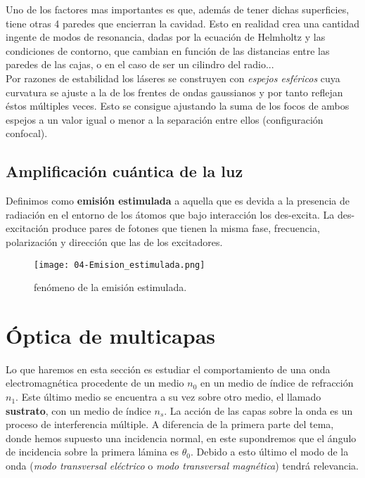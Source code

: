 \documentclass[12pt,a4paper]{book}
\numberwithin{equation}{section}
\numberwithin{figure}{section}
\newcommand{\1}{_{(1)}}
\newcommand{\2}{_{(2)}}
\theoremstyle{definition}
\begin{document}
Uno de los factores mas importantes es que, además de tener dichas superficies, tiene otras 4 paredes que encierran la cavidad. Esto en realidad crea una cantidad ingente de modos de resonancia, dadas por la ecuación de Helmholtz y las condiciones de contorno, que cambian en función de las distancias entre las paredes de las cajas, o en el caso de ser un cilindro del radio... \\

Por razones de estabilidad los láseres se construyen con \textit{espejos esféricos} cuya curvatura se ajuste a la de los frentes de ondas gaussianos y por tanto reflejan éstos múltiples veces. Esto se consigue ajustando la suma de los focos de ambos espejos a un valor igual o menor a la separación entre ellos (configuración confocal). 

\subsection{Amplificación cuántica de la luz}

Definimos como \textbf{emisión estimulada} a aquella que es devida a la presencia de radiación en el entorno de los átomos que bajo interacción los des-excita. La des-excitación produce pares de fotones que tienen la misma fase, frecuencia, polarización y dirección que las de los excitadores. \\

\begin{figure}[h!] \centering
\texttt{[image: 04-Emision\_estimulada.png]}
\caption{fenómeno de la emisión estimulada.}
\label{Fig:04.5-05}
\end{figure}

\section{Óptica de multicapas}

Lo que haremos en esta sección es estudiar el comportamiento de una onda electromagnética procedente de un medio $n_0$ en un medio de índice de refracción $n_1$. Este último medio se encuentra a su vez sobre otro medio, el llamado \textbf{sustrato}, con un medio de índice $n_s$. La acción de las capas sobre la onda es un proceso de interferencia múltiple. A diferencia de la primera parte del tema, donde hemos supuesto una incidencia normal, en este supondremos que el ángulo de incidencia sobre la primera lámina es $\theta_0$. Debido a esto último el modo de la onda (\textit{modo transversal eléctrico} o \textit{modo transversal magnética}) tendrá relevancia. \\
\end{document}

